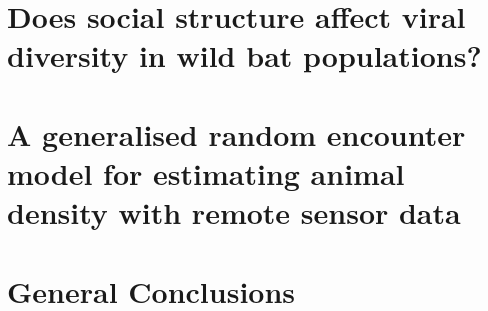 \documentclass[11pt,phd,a4paper,twoside]{pretty_thesis}
\begin{document}
\chapter[Social structure in wild populations]{Does social structure affect viral diversity in wild bat populations?}
\label{chapterlabel4}



\chapter[gREM for estimating animal density]{A generalised random encounter model for estimating animal density with remote sensor data}
\label{chapterlabel5}


\chapter{General Conclusions}
\label{chapterlabel4}




 




\end{document}
